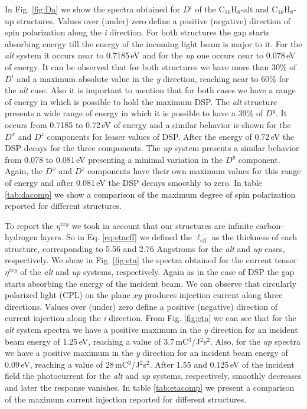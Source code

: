 \documentclass[pss]{wiley2sp} %
\begin{document}
In Fig. \ref{fig:Da} we show the spectra obtained for
{$D^{i}$} of the C$_{16}$H$_{8}$-alt and C$_{16}$H$_{8}$-up structures. Values over
(under) zero define a positive (negative) direction of spin polarization along
the \emph{i} direction. 
For both structures the gap starts absorbing energy till the energy of the incoming light beam is major to it. For the \emph{alt} system it occurs near to 0.7185\,eV and for the \emph{up} one occurs near to 0.078\,eV of energy. 
It can be observed that for both structures we have
more than 30\% of {$D^{i}$} and a maximum absolute value in the \emph{y} direction,
reaching near to 60\% for the \emph{alt} case. 
Also it is important to mention that for both cases we have a range of energy in which is possible to hold the maximum DSP. 
The \emph{alt} structure presents a wide range of energy in which it is possible to have a 39\% of $D^{y}$.  It occurs from  0.7185 to 0.72\,eV of energy and a similar behavior is shown for the  $D^{x}$ and $D^{z}$ components for leaser values of DSP. After the energy of 0.72\,eV the DSP decays for the three components. 
The \emph{up} system presents a similar behavior from 0.078 to 0.081\,eV presenting a minimal variation in the $D^{y}$ component. Again, the $D^{x}$ and $D^{z}$ components have their own maximum values for this range of energy and after 0.081\,eV the DSP decays smoothly to zero.
In table \ref{tab:dacomp}
we show a comparison of the maximum degree of spin polarization reported for
different structures.

To report the {$\eta^{ixy}$} we took in account that our structures are infinite 
carbon-hydrogen layers. So in Eq. \ref{eq:etaeff} we defined the 
$\ell_{\text{eff}}$
as the thickness of each structure, corresponding to 5.56 and 2.76 Angstroms for 
the \emph{alt} and \emph{up} cases, respectively. We show in Fig. \ref{fig:eta}
the spectra obtained for the current tensor {$\eta^{ixy}$} of the
\emph{alt} and \emph{up} systems, respectively. Again as in the case of DSP the gap starts absorbing the energy of the incident beam. We can observe that
circularly polarized light (CPL) on the plane $xy$ produces injection current
along three directions. Values over (under) zero define a positive (negative)
direction of current injection along the \emph{i} direction. From Fig.
\ref{fig:eta} we can see that for the \emph{alt} system spectra 
we have a positive maximum in the \emph{y} direction for an
incident beam energy of 1.25\,eV, reaching a value of
3.7\,mC$^{3}$/J$^{2}$s$^{2}$. Also, for the \emph{up} spectra 
we have a positive maximum in the \emph{y} direction for an
incident beam energy of 0.09\,eV, reaching a value of
28\,mC$^{3}$/J$^{2}$s$^{2}$. After 1.55 and 0.125\,eV of the incident field the photocurrent for the \emph{alt} and \emph{up} systems, respectively, smoothly decreases and later the response vanishes. In table \ref{tab:etacomp} we present a comparison
of the maximum current injection reported for different structures.
\end{document}
